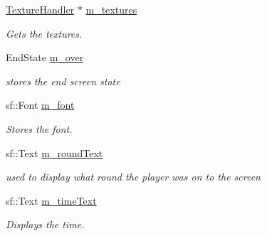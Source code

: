 \begin{DoxyCompactItemize}
\item 
\mbox{\label{class_end_screen_a731fe85d621665a781f5b9754f9fd8bf}} 
\mbox{\hyperlink{class_texture_handler}{Texture\+Handler}} $\ast$ \mbox{\hyperlink{class_end_screen_a731fe85d621665a781f5b9754f9fd8bf}{m\+\_\+textures}}
\begin{DoxyCompactList}\small\item\em Gets the textures. \end{DoxyCompactList}\item 
\mbox{\label{class_end_screen_a981ca19d838d0b2c669eb0f34a9900bc}} 
End\+State \mbox{\hyperlink{class_end_screen_a981ca19d838d0b2c669eb0f34a9900bc}{m\+\_\+over}}
\begin{DoxyCompactList}\small\item\em stores the end screen state \end{DoxyCompactList}\item 
\mbox{\label{class_end_screen_a4a997b23ab2d79fe75dd7ceea33ea1ae}} 
sf\+::\+Font \mbox{\hyperlink{class_end_screen_a4a997b23ab2d79fe75dd7ceea33ea1ae}{m\+\_\+font}}
\begin{DoxyCompactList}\small\item\em Stores the font. \end{DoxyCompactList}\item 
\mbox{\label{class_end_screen_a1f1c5b95fd0a4956ca424b9cb648baba}} 
sf\+::\+Text \mbox{\hyperlink{class_end_screen_a1f1c5b95fd0a4956ca424b9cb648baba}{m\+\_\+round\+Text}}
\begin{DoxyCompactList}\small\item\em used to display what round the player was on to the screen \end{DoxyCompactList}\item 
\mbox{\label{class_end_screen_af88c60579eafb6a373f27e91bb9e979a}} 
sf\+::\+Text \mbox{\hyperlink{class_end_screen_af88c60579eafb6a373f27e91bb9e979a}{m\+\_\+time\+Text}}
\begin{DoxyCompactList}\small\item\em Displays the time. \end{DoxyCompactList}\item 
\mbox{\label{class_end_screen_a63e6204ce588b54205a973d9607cb34d}} 

\end{DoxyCompactItemize}
